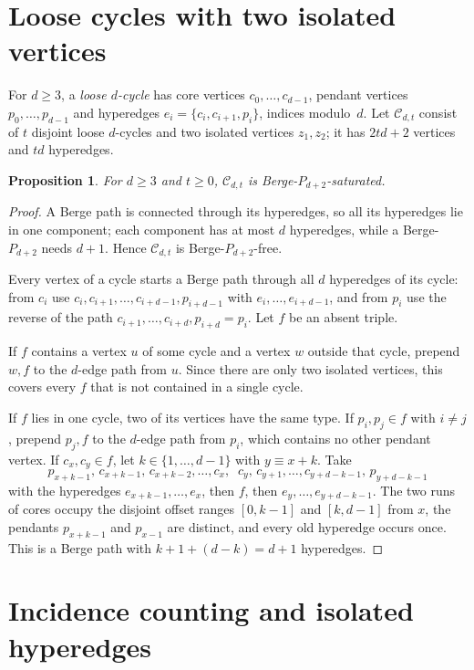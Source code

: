 \documentclass[11pt]{article}
\newtheorem{proposition}[theorem]{Proposition}
\theoremstyle{definition}
\theoremstyle{remark}
\begin{document}
\section{Loose cycles with two isolated vertices}

For $d\ge3$, a \emph{loose $d$-cycle} has core vertices $c_0,\dots,c_{d-1}$,
pendant vertices $p_0,\dots,p_{d-1}$ and hyperedges
$e_i=\{c_i,c_{i+1},p_i\}$, indices modulo~$d$. Let $\mathcal C_{d,t}$
consist of $t$ disjoint loose $d$-cycles and two isolated vertices
$z_1,z_2$; it has $2td+2$ vertices and $td$ hyperedges.

\begin{proposition}\label{prop:cycles}
For $d\ge3$ and $t\ge0$, $\mathcal C_{d,t}$ is Berge-$P_{d+2}$-saturated.
\end{proposition}

\begin{proof}
A Berge path is connected through its hyperedges, so all its hyperedges
lie in one component; each component has at most $d$ hyperedges, while a
Berge-$P_{d+2}$ needs $d+1$. Hence $\mathcal C_{d,t}$ is Berge-$P_{d+2}$-free.

Every vertex of a cycle starts a Berge path through all $d$ hyperedges of
its cycle: from $c_i$ use $c_i,c_{i+1},\dots,c_{i+d-1},p_{i+d-1}$ with
$e_i,\dots,e_{i+d-1}$, and from $p_i$ use the reverse of the path
$c_{i+1},\dots,c_{i+d},p_{i+d}=p_i$. Let $f$ be an absent triple.

If $f$ contains a vertex $u$ of some cycle and a vertex $w$ outside that
cycle, prepend $w,f$ to the $d$-edge path from $u$. Since there are only
two isolated vertices, this covers every $f$ that is not contained in a
single cycle.

If $f$ lies in one cycle, two of its vertices have the same type. If
$p_i,p_j\in f$ with $i\ne j$, prepend $p_j,f$ to the $d$-edge path from
$p_i$, which contains no other pendant vertex. If $c_x,c_y\in f$, let
$k\in\{1,\dots,d-1\}$ with $y\equiv x+k$. Take
\[
p_{x+k-1},\,c_{x+k-1},\,c_{x+k-2},\dots,c_x,\;\;c_y,\,c_{y+1},\dots,c_{y+d-k-1},\,p_{y+d-k-1}
\]
with the hyperedges $e_{x+k-1},\dots,e_x$, then $f$, then
$e_y,\dots,e_{y+d-k-1}$. The two runs of cores occupy the disjoint
offset ranges $[0,k-1]$ and $[k,d-1]$ from $x$, the pendants $p_{x+k-1}$
and $p_{x-1}$ are distinct, and every old hyperedge occurs once. This is a
Berge path with $k+1+(d-k)=d+1$ hyperedges.
\end{proof}

\section{Incidence counting and isolated hyperedges}
\end{document}
